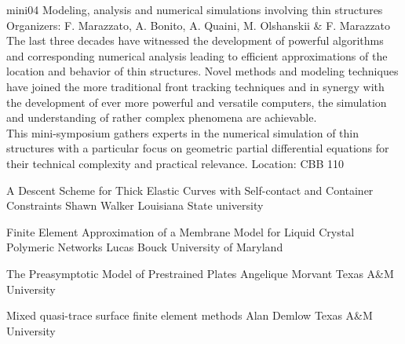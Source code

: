 \mini
{mini04}
{Modeling, analysis and numerical simulations involving thin structures}
{Organizers: F. Marazzato, A. Bonito, A. Quaini, M. Olshanskii \& F. Marazzato}
{The last three decades have witnessed the development of powerful algorithms and corresponding numerical analysis leading to efficient approximations of the location and behavior of thin structures. Novel methods and modeling techniques have joined the more traditional front tracking techniques and in synergy with the development of ever more powerful and versatile computers, the simulation and understanding of rather complex phenomena are achievable.\\
This mini-symposium gathers experts in the numerical simulation of thin structures with a particular focus on geometric partial differential equations for their technical complexity and practical relevance.}
{Location: CBB 110}

\begin{talks}
\item\talk
{A Descent Scheme for Thick Elastic Curves with Self-contact and Container Constraints}
{Shawn Walker}
{Louisiana State university}
\item\talk
{Finite Element Approximation of a Membrane Model for Liquid Crystal Polymeric Networks}
{Lucas Bouck}
{University of Maryland}
\item\talk
{The Preasymptotic Model of Prestrained Plates}
{Angelique Morvant}
{Texas A\&M University}
\item\talk
{Mixed quasi-trace surface finite element methods}
{Alan Demlow}
{Texas A\&M University}
\end{talks}
\room
